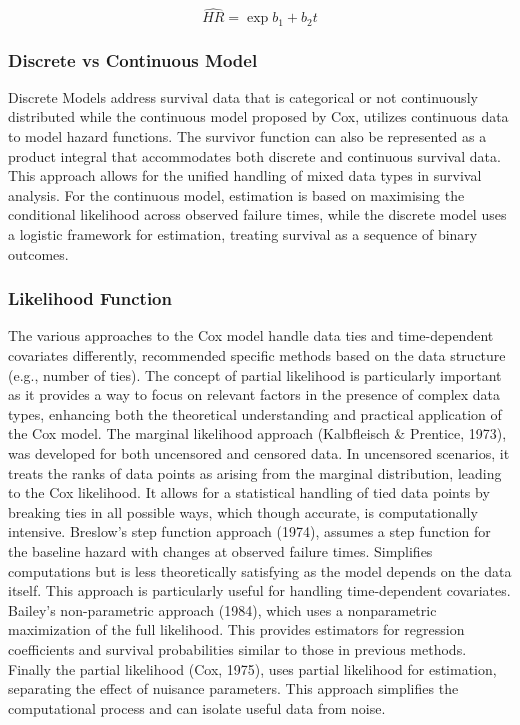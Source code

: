 \begin{equation} \label{eq:coxtimeratio}\hat{HR} = \exp{b_{1}+b_{2}t}\end{equation}

\subsubsection{Discrete vs Continuous Model}
\noindent \parencite{kalbfleisch_fifty_2023} Discrete Models address survival data that is categorical or not continuously distributed while the continuous model proposed by Cox, utilizes continuous data to model hazard functions. The survivor function can also be represented as a product integral that accommodates both discrete and continuous survival data. This approach allows for the unified handling of mixed data types in survival analysis. For the continuous model, estimation is based on maximising the conditional likelihood across observed failure times, while the discrete model uses a logistic framework for estimation, treating survival as a sequence of binary outcomes.

\subsubsection{Likelihood Function}
\noindent The various approaches to the Cox model handle data ties and time-dependent covariates differently, \parencite{kalbfleisch_fifty_2023} recommended specific methods based on the data structure (e.g., number of ties). The concept of partial likelihood is particularly important as it provides a way to focus on relevant factors in the presence of complex data types, enhancing both the theoretical understanding and practical application of the Cox model. The marginal likelihood approach \parencite{kalbfleisch_fifty_2023} (Kalbfleisch \& Prentice, 1973), was developed for both uncensored and censored data. In uncensored scenarios, it treats the ranks of data points as arising from the marginal distribution, leading to the Cox likelihood. It allows for a statistical handling of tied data points by breaking ties in all possible ways, which though accurate, is computationally intensive. \parencite{kalbfleisch_fifty_2023} Breslow's step function approach (1974), assumes a step function for the baseline hazard with changes at observed failure times. Simplifies computations but is less theoretically satisfying as the model depends on the data itself. This approach is particularly useful for handling time-dependent covariates. \parencite{kalbfleisch_fifty_2023} Bailey's non-parametric approach (1984), which uses a nonparametric maximization of the full likelihood. This provides estimators for regression coefficients and survival probabilities similar to those in previous methods. Finally the partial likelihood \parencite{kalbfleisch_fifty_2023} (Cox, 1975), uses partial likelihood for estimation, separating the effect of nuisance parameters. This approach simplifies the computational process and can isolate useful data from noise.


